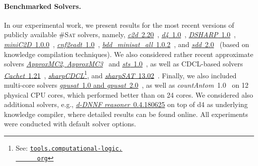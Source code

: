 \documentclass{llncs}
\newcommand{\cSAT}{\textsc{\#Sat}\xspace}%
\newcommand{\WMC}{\textsc{WMC}\xspace}%
\newcommand{\gpusatnu}{{\small\textsf{gpusat2}}\xspace}
\newcommand{\gpusatnuv}[1]{{\small\textsf{gpusat2({\textit{#1}})}}\xspace}
\newcommand{\gpusatone}{{\small\textsf{gpusat1}}\xspace}
\begin{document}
\paragraph{Benchmarked Solvers.}
In our experimental work, we present results for the most recent
versions of publicly available \cSAT solvers, namely,
%
\href{http://reasoning.cs.ucla.edu/c2d/download.php}{\textit{c2d}~2.20}~\cite{Darwiche04a},
\href{http://www.cril.univ-artois.fr/KC/d4.html}{\textit{d4}~1.0}~\cite{LagniezMarquis17a},
\href{https://bitbucket.org/haz/dsharp}{\textit{DSHARP}~1.0}~\cite{MuiseEtAl12a},
\href{http://reasoning.cs.ucla.edu/minic2d/}{\textit{miniC2D}~1.0.0}~\cite{OztokDarwiche15a},
\href{http://www.cril.univ-artois.fr/KC/eadt.html}{\textit{cnf2eadt}~1.0}~\cite{KoricheLagniezMarquisThomas13a}, 
\href{http://www.sd.is.uec.ac.jp/toda/code/cnf2obdd.html}{\textit{bdd\_{}minisat\_\allowbreak{}all}~1.0.2}~\cite{TodaSoh15a},
and \href{http://reasoning.cs.ucla.edu/sdd/}{\textit{sdd}~2.0}~\cite{Darwiche11a} (based on %
knowledge compilation techniques).
%
%
%
%
%
%
%
We also considered rather recent approximate solvers
\href{https://bitbucket.org/kuldeepmeel/approxmc}{\textit{ApproxMC2}, \textit{ApproxMC3}}~\cite{ChakrabortyEtAl14a}
and
\href{http://cs.stanford.edu/~ermon/code/STS.zip}{\textit{sts}~1.0}~\cite{ErmonGomesSelman12a},
%
as well as %
CDCL-based solvers
%
\href{https://www.cs.rochester.edu/u/kautz/Cachet/cachet-wmc-1-21.zip}{\textit{Cachet}~1.21}~\cite{SangEtAl04},
\href{http://tools.computational-logic.org/content/sharpCDCL.php}{\textit{sharpCDCL}}\footnote{See:
  \href{http://tools.computational-logic.
    org/content/sharpCDCL.php}{\nolinkurl{tools.computational-logic.
      org}}}, %
and
\href{https://sites.google.com/site/marcthurley/sharpsat}{\textit{sharpSAT}~13.02}~\cite{Thurley06a}.
%
Finally, we also included multi-core solvers
\href{https://github.com/daajoe/GPUSAT/releases/tag/v0.815-pre}{\textit{gpusat}~1.0 and \textit{gpusat}~2.0}~\cite{FichteHecherZisser19}, as well as
\textit{countAntom}~1.0~\cite{BurchardSchubertBecker15a} on 12 physical CPU
cores, which performed better than on 24 cores.
%
%
%
%
%
%
%
%
We considered also additional solvers, e.g., %
\href{http://www.cril.univ-artois.fr/kc/ressources/query-dnnf-0.4.180625.zip}{\textit{d-DNNF
    reasoner}~0.4.180625} on top of d4 as underlying knowledge
compiler, where detailed results can be found online. %
All experiments were conducted with default solver options.
%
%
%
%
%
%
%
%
%
\end{document}
